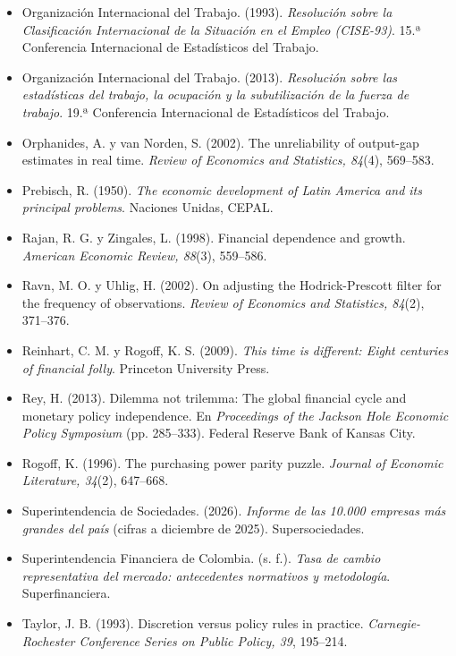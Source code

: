 \begin{itemize}[leftmargin=1.2em,itemindent=-1.2em]
\item[] Organización Internacional del Trabajo. (1993). \emph{Resolución sobre la Clasificación Internacional de la Situación en el Empleo (CISE-93)}. 15.ª Conferencia Internacional de Estadísticos del Trabajo.
\item[] Organización Internacional del Trabajo. (2013). \emph{Resolución sobre las estadísticas del trabajo, la ocupación y la subutilización de la fuerza de trabajo}. 19.ª Conferencia Internacional de Estadísticos del Trabajo.
\item[] Orphanides, A. y van Norden, S. (2002). The unreliability of output-gap estimates in real time. \emph{Review of Economics and Statistics, 84}(4), 569–583.
\item[] Prebisch, R. (1950). \emph{The economic development of Latin America and its principal problems}. Naciones Unidas, CEPAL.
\item[] Rajan, R. G. y Zingales, L. (1998). Financial dependence and growth. \emph{American Economic Review, 88}(3), 559–586.
\item[] Ravn, M. O. y Uhlig, H. (2002). On adjusting the Hodrick-Prescott filter for the frequency of observations. \emph{Review of Economics and Statistics, 84}(2), 371–376.
\item[] Reinhart, C. M. y Rogoff, K. S. (2009). \emph{This time is different: Eight centuries of financial folly}. Princeton University Press.
\item[] Rey, H. (2013). Dilemma not trilemma: The global financial cycle and monetary policy independence. En \emph{Proceedings of the Jackson Hole Economic Policy Symposium} (pp. 285–333). Federal Reserve Bank of Kansas City.
\item[] Rogoff, K. (1996). The purchasing power parity puzzle. \emph{Journal of Economic Literature, 34}(2), 647–668.
\item[] Superintendencia de Sociedades. (2026). \emph{Informe de las 10.000 empresas más grandes del país} (cifras a diciembre de 2025). Supersociedades.
\item[] Superintendencia Financiera de Colombia. (s. f.). \emph{Tasa de cambio representativa del mercado: antecedentes normativos y metodología}. Superfinanciera.
\item[] Taylor, J. B. (1993). Discretion versus policy rules in practice. \emph{Carnegie-Rochester Conference Series on Public Policy, 39}, 195–214.
\end{itemize}